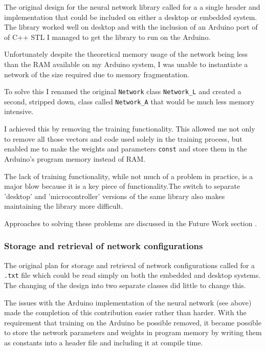 \documentclass[a4paper]{article}
\begin{document}
The original design for the neural network library called for a a single header and implementation that could be included on either a desktop or embedded system. The library worked well on desktop and with the inclusion of an Arduino port of of C++ STL\cite{evref1} I managed to get the library to run on the Arduino. 

Unfortunately despite the theoretical memory usage of the network being less than the RAM available on my Arduino system, I was unable to instantiate a network of the size required due to memory fragmentation. 

To solve this I renamed the original \lstinline{Network} class \lstinline{Network_L} and created a second, stripped down, class called \lstinline{Network_A} that would be much less memory intensive.

I achieved this by removing the training functionality. This allowed me not only to remove all those vectors and code used solely in the training process, but enabled me to make the weights and parameters \lstinline{const} and store them in the Arduino's program memory instead of RAM. 

The lack of training functionality, while not much of a problem in practice, is a major blow because it is a key piece of functionality.The switch to separate 'desktop' and 'microcontroller' versions of the same library also makes maintaining the library more difficult.

Approaches to solving these problems are discussed in the Future Work section .

\subsubsection{Storage and retrieval of network configurations}

The original plan for storage and retrieval of network configurations called for a \lstinline{.txt} file which could be read simply on both the embedded and desktop systems. The changing of the design into two separate classes did little to change this.

The issues with the Arduino implementation of the neural network (see above) made the completion of this contribution easier rather than harder. With the requirement that training on the Arduino be possible removed, it became possible to store the network parameters and weights in program memory by writing them as constants into a header file and including it at compile time. 
\end{document}
